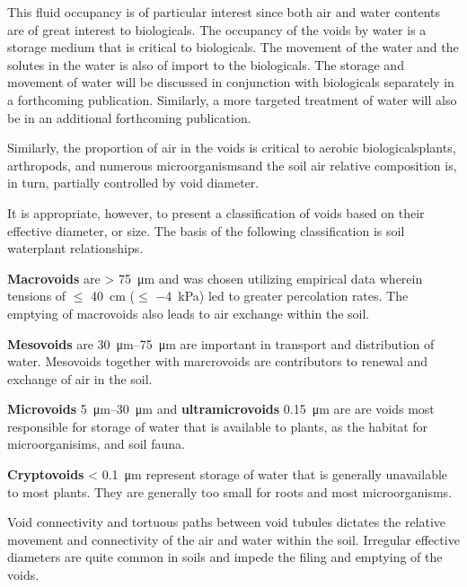 \documentclass[a5paper]{report}
\begin{document}

This fluid occupancy is of particular interest since both air and water contents are of great interest to biologicals. The occupancy of the voids by water is a storage medium that is critical to biologicals. The movement of the water and the solutes in the water is also of import to the biologicals. The storage and movement of water will be discussed in conjunction with biologicals separately in a forthcoming publication. Similarly, a more targeted treatment of water will also be in an additional forthcoming publication.  

Similarly, the proportion of air in the voids is critical to aerobic biologicals\textemdash{}plants, arthropods, and numerous microorganisms\textemdash{}and the soil air relative composition is, in turn, partially controlled by void diameter.

It is appropriate, however, to present a classification of voids based on their effective diameter, or size. The basis of the following classification is soil water\textemdash{}plant relationships.  

\textbf{Macrovoids} are \textgreater{} \qty{75}{\micro\metre} and was chosen utilizing empirical data wherein tensions of $\leq$ \qty{40}{\centi\metre} ($\leq$ \qty{-4}{kPa}) led to greater percolation rates. The emptying of macrovoids also leads to air exchange within the soil.  

\textbf{Mesovoids} are \qtyrange{30}{75}{\micro\metre} are important in transport and distribution of water. Mesovoids together with marcrovoids are contributors to renewal and exchange of air in the soil.  

\textbf{Microvoids} \qtyrange{5}{30}{\micro\metre} and \textbf{ultramicrovoids} \qty{0.1}{}\textemdash \qty{5}{\micro\metre} are are voids most responsible for storage of water that is available to plants, as the habitat for microorganisims, and soil fauna.  

\textbf{Cryptovoids} \textless{} \qty{0.1}{\micro\metre} represent storage of water that is generally unavailable to most plants. They are generally too small for roots and most microorganisms.  

Void connectivity and tortuous paths between void tubules dictates the relative movement and connectivity of the air and water within the soil. Irregular effective diameters are quite common in soils and impede the filing and emptying of the voids.  
\end{document}
